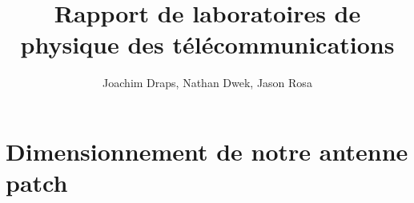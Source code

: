 \documentclass[a4paper, 11pt, frenchb]{article}
\title{Rapport de laboratoires de physique des télécommunications}
\author{Joachim Draps, Nathan Dwek, Jason Rosa}
\begin{document}
\maketitle
\tableofcontents

%

\section{Dimensionnement de notre antenne patch}

\end{document}
